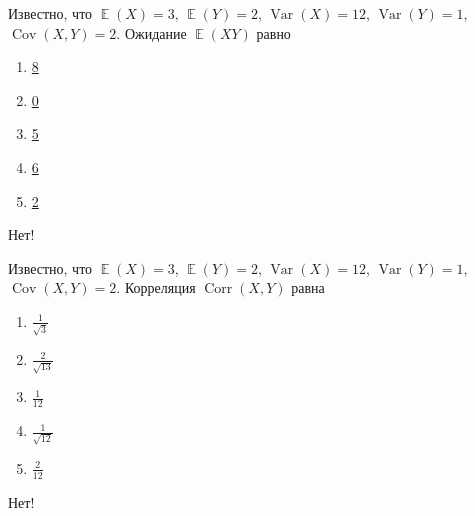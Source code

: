 \documentclass[t]{beamer}
\DeclareMathOperator{\Var}{Var}
\DeclareMathOperator{\Cov}{Cov}
\DeclareMathOperator{\Corr}{Corr}
\DeclareMathOperator{\E}{\mathbb{E}}
\begin{document}
 \begin{frame} \label{11-No} 
\begin{block}{11} 

  Известно, что $\E(X)=3$, $\E(Y)=2$, $\Var(X)=12$, $\Var(Y)=1$, $\Cov(X,Y)=2$. Ожидание $\E(XY)$ равно
  


 \end{block} 
\begin{enumerate} 
\item[] \hyperlink{11-Yes}{\beamergotobutton{} 8}
\item[] \hyperlink{11-No}{\beamergotobutton{} 0}
\item[] \hyperlink{11-No}{\beamergotobutton{} 5}
\item[] \hyperlink{11-No}{\beamergotobutton{} 6}
\item[] \hyperlink{11-No}{\beamergotobutton{} 2}
\end{enumerate} 

 \alert{Нет!} 
\end{frame} 


 \begin{frame} \label{12-No} 
\begin{block}{12} 

  Известно, что $\E(X)=3$, $\E(Y)=2$, $\Var(X)=12$, $\Var(Y)=1$, $\Cov(X,Y)=2$. Корреляция $\Corr(X,Y)$ равна
  


 \end{block} 
\begin{enumerate} 
\item[] \hyperlink{12-Yes}{\beamergotobutton{} $\frac{1}{\sqrt{3}}$}
\item[] \hyperlink{12-No}{\beamergotobutton{} $\frac{2}{\sqrt{13}}$}
\item[] \hyperlink{12-No}{\beamergotobutton{} $\frac{1}{12}$}
\item[] \hyperlink{12-No}{\beamergotobutton{} $\frac{1}{\sqrt{12}}$}
\item[] \hyperlink{12-No}{\beamergotobutton{} $\frac{2}{12}$}
\end{enumerate} 

 \alert{Нет!} 
\end{frame} 
\end{document}
